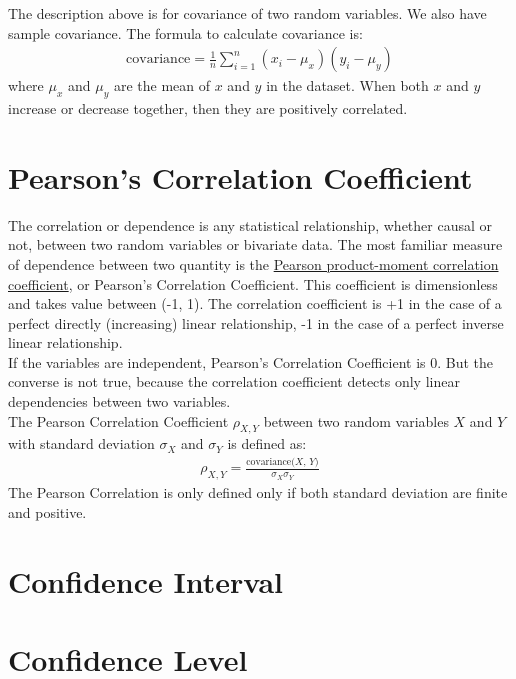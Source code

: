 The description above is for covariance of two random variables. We also have sample covariance. The formula to calculate covariance is:\\
\begin{eqnarray}
\text{covariance} = \frac{1}{n} \sum^{n}_{i =1} (x_i - \mu_x)(y_i - \mu_y)
\label{covariance}
\end{eqnarray}
where $\mu_x$ and $\mu_y$ are the mean of $x$ and $y$ in the dataset. When both $x$ and $y$ increase or decrease together, then they are positively correlated.

\section{Pearson's Correlation Coefficient}

The correlation or dependence is any statistical relationship, whether causal or not, between two random variables or bivariate data. The most familiar measure of dependence between two quantity is the \underline{Pearson product-moment correlation coefficient}, or Pearson's Correlation Coefficient. This coefficient is dimensionless and takes value between (-1, 1). The correlation coefficient is +1 in the case of a perfect directly (increasing) linear relationship, -1 in the case of a perfect inverse linear relationship. \\

If the variables are independent, Pearson's Correlation Coefficient is 0. But the converse is not true, because the correlation coefficient detects only linear dependencies between two variables.\\

The Pearson Correlation Coefficient $\rho_{X,Y}$ between two random variables $X$ and $Y$ with standard deviation $\sigma_X$ and $\sigma_Y$ is defined as:
\begin{eqnarray}
\rho_{X,Y} = \frac{\text{covariance($X$, $Y$)}}{\sigma_X \sigma_Y}
\label{pearson}
\end{eqnarray}
The Pearson Correlation is only defined only if both standard deviation are finite and positive. 


\section{Confidence Interval}

\section{Confidence Level}

